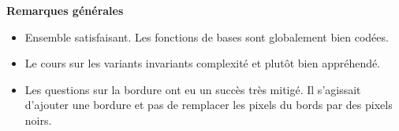 \documentclass[10pt,fleqn]{book} %
\begin{document}

\pagestyle{fancy}
\thispagestyle{plain}


\def\columnseprulecolor{\color{ocre}}
\setlength{\columnseprule}{0pt} 



\vspace{6cm}
%

\textbf{Remarques générales}
\begin{itemize}
\item Ensemble satisfaisant. Les fonctions de bases sont globalement bien codées. 
\item Le cours sur les variants invariants complexité et plutôt bien appréhendé. 
\item Les questions sur la bordure ont eu un succès très mitigé. Il s'agissait d'ajouter une bordure et pas de remplacer les pixels du bords par des pixels noirs. 
\end{itemize}



\end{document}
